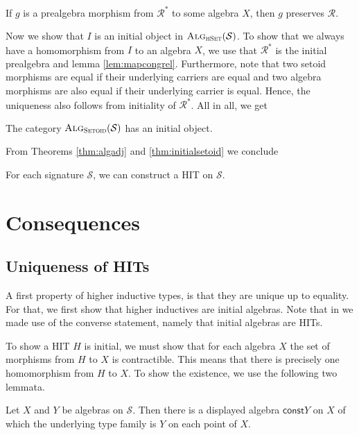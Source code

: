 \documentclass[9pt]{entcs}
\newcommand{\type}[1]{\textsc{#1}}
\newcommand{\category}[1]{\textsc{#1}}
\newcommand{\function}[1]{\mathsf{#1}}
\newcommand{\hset}{\type{hSet}} %
\newcommand{\0}{\textbf{0}} %
\newcommand{\1}{\textbf{1}} %
\newcommand{\setoids}{\category{Setoid}} %
\newcommand{\sig}{\mathcal{S}} %
\newcommand{\Alg}[1]{\category{Alg}_{\hset}(#1)} %
\newcommand{\Algst}[1]{\category{Alg}_{\setoids}(#1)} %
\newcommand{\constdisp}{\function{const}} %
\newcommand{\CR}{\mathcal{R}^*} %
\newcommand{\CRR}{\mathcal{R}} %
\begin{document}
\begin{lemma}
\label{lem:mapcongrel}
If $g$ is a prealgebra morphism from $\CR$ to some algebra $X$, then $g$ preserves $\CRR$.
\end{lemma}

Now we show that $I$ is an initial object in $\Alg{\sig}$.
To show that we always have a homomorphism from $I$ to an algebra $X$, we use that $\CR$ is the initial prealgebra and lemma \ref{lem:mapcongrel}.
Furthermore, note that two setoid morphisms are equal if their underlying carriers are equal and two algebra morphisms are also equal if their underlying carrier is equal.
Hence, the uniqueness also follows from initiality of $\CR$.
All in all, we get

\begin{theorem}
\label{thm:initialsetoid}
The category $\Algst{\sig}$ has an initial object.
\end{theorem}

From Theorems \ref{thm:algadj} and \ref{thm:initialsetoid} we conclude

\begin{corollary}
\label{thm:hit-exist}
For each signature $\sig$, we can construct a HIT on $\sig$.
\end{corollary}

\section{Consequences}
\label{sec:consequences}
\subsection{Uniqueness of HITs}
A first property of higher inductive types, is that they are unique up to equality.
For that, we first show that higher inductives are initial algebras.
Note that in  we made use of the converse statement, namely that initial algebras are HITs.

To show a HIT $H$ is initial, we must show that for each algebra $X$ the set of morphisms from $H$ to $X$ is contractible.
This means that there is precisely one homomorphism from $H$ to $X$.
To show the existence, we use the following two lemmata.

\begin{lemma}
Let $X$ and $Y$ be algebras on $\sig$.
Then there is a displayed algebra $\constdisp{Y}$ on $X$ of which the underlying type family is $Y$ on each point of $X$.
\end{lemma}
\end{document}
